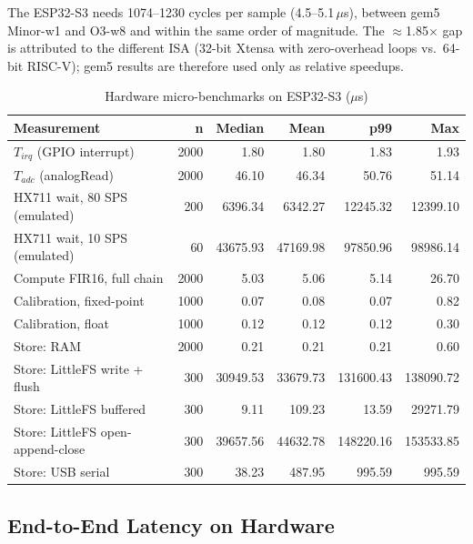 \documentclass[12pt, a4paper]{article}
\begin{document}
The ESP32-S3 needs 1074--1230 cycles per sample (4.5--5.1\,$\mu$s), between gem5 Minor-w1 and O3-w8 and within the same order of magnitude. The $\approx$1.85$\times$ gap is attributed to the different ISA (32-bit Xtensa with zero-overhead loops vs.\ 64-bit RISC-V); gem5 results are therefore used only as relative speedups.

\begin{table}[h!]
\centering
\caption{Hardware micro-benchmarks on ESP32-S3 ($\mu$s)}
\vspace{0.2cm}
\begin{tabular}{@{}lrrrrr@{}}
\toprule
\textbf{Measurement} & \textbf{n} & \textbf{Median} & \textbf{Mean} & \textbf{p99} & \textbf{Max} \\ \midrule
$T_{irq}$ (GPIO interrupt)        & 2000 & 1.80     & 1.80     & 1.83      & 1.93 \\
$T_{adc}$ (analogRead)            & 2000 & 46.10    & 46.34    & 50.76     & 51.14 \\
HX711 wait, 80 SPS (emulated)     & 200  & 6396.34  & 6342.27  & 12245.32  & 12399.10 \\
HX711 wait, 10 SPS (emulated)     & 60   & 43675.93 & 47169.98 & 97850.96  & 98986.14 \\
Compute FIR16, full chain         & 2000 & 5.03     & 5.06     & 5.14      & 26.70 \\
Calibration, fixed-point          & 1000 & 0.07     & 0.08     & 0.07      & 0.82 \\
Calibration, float                & 1000 & 0.12     & 0.12     & 0.12      & 0.30 \\
Store: RAM                        & 2000 & 0.21     & 0.21     & 0.21      & 0.60 \\
Store: LittleFS write + flush     & 300  & 30949.53 & 33679.73 & 131600.43 & 138090.72 \\
Store: LittleFS buffered          & 300  & 9.11     & 109.23   & 13.59     & 29271.79 \\
Store: LittleFS open-append-close & 300  & 39657.56 & 44632.78 & 148220.16 & 153533.85 \\
Store: USB serial                 & 300  & 38.23    & 487.95   & 995.59    & 995.59 \\ \bottomrule
\end{tabular}
\end{table}

\FloatBarrier
\subsection{End-to-End Latency on Hardware}
\end{document}
